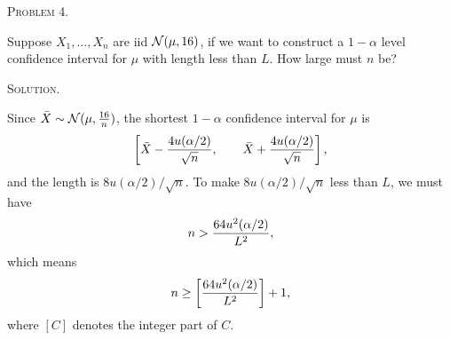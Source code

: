 \documentclass{article}
\begin{document}
\begin{CJK}{UTF8}{gbsn}
    \begin{shaded}
        \noindent\textsc{Problem 4.}\par
        Suppose $X_1, \ldots, X_n$ are iid ${\mathcal N}(\mu, 16)$, if we want to construct a $1-\alpha$ level
        confidence interval for $\mu$ with length less than $L$. How large must $n$ be?
    \end{shaded}
    \noindent\textsc{Solution.}\par
    Since $\bar{X} \sim {\mathcal N}(\mu, \frac{16}{n})$, the shortest $1-\alpha$ confidence interval for $\mu$ is
    \begin{align}
        \left [ \bar{X} - \frac{4 u(\alpha / 2)}{\sqrt{n}}, \qquad \bar{X}  + \frac{4 u(\alpha / 2)}{\sqrt{n}}\right ], \notag
    \end{align}
    and the length is $8u(\alpha / 2) / \sqrt{n}$.
    To make $8u(\alpha / 2) / \sqrt{n}$ less than $L$, we must have
    \begin{align}
        n > \frac{64 u^2(\alpha / 2)}{L^2}, \notag
    \end{align}
    which means
    \begin{align}
        n \geq \left [\frac{64 u^2(\alpha / 2)}{L^2} \right ] + 1, \notag
    \end{align}
    where $\left [C \right ]$ denotes the integer part of $C$.

\end{CJK}
\end{document}
